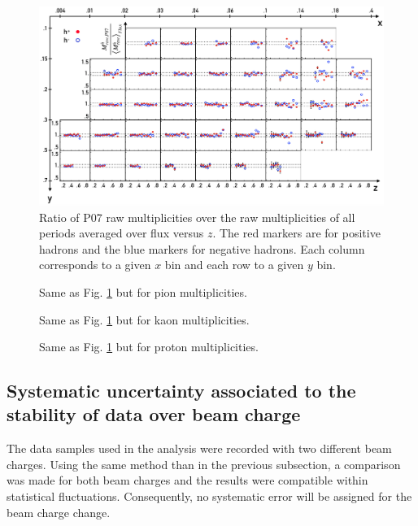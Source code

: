 \begin{figure}[!h]
  \centering
	\includegraphics[scale=0.85]{./gfx/SysTimeMult.png}
	\caption{Ratio of P07 raw multiplicities over the raw multiplicities of all periods averaged over flux versus $z$. The red markers are for positive hadrons and the blue markers for negative hadrons. Each column corresponds to a given $x$ bin and each row to a given $y$ bin.}
	\label{pic:hMultTime}
\end{figure}

\begin{figure}[!h]
  \centering
	\caption{Same as Fig. \ref{pic:hMultTime} but for pion multiplicities.}
	\label{pic:piMultTime}
\end{figure}

\begin{figure}[!h]
  \centering
	\caption{Same as Fig. \ref{pic:hMultTime} but for kaon multiplicities.}
	\label{pic:kMultTime}
\end{figure}

\begin{figure}[!h]
  \centering
	\caption{Same as Fig. \ref{pic:hMultTime} but for proton multiplicities.}
	\label{pic:pMultTime}
\end{figure}


\subsection{Systematic uncertainty associated to the stability of data over beam charge}

The data samples used in the analysis were recorded with two different beam charges. Using the same method than in the previous subsection, a comparison was made for both beam charges and the results were compatible within statistical fluctuations. Consequently, no systematic error will be assigned for the beam charge change.


